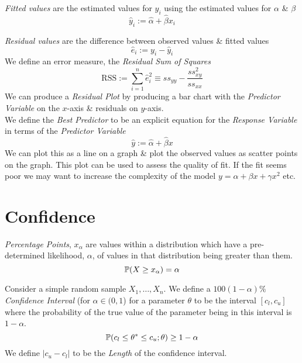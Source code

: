 \documentclass[11pt,a4paper]{article}
\begin{document}
\textit{Fitted values} are the estimated values for $y_i$ using the estimated values for $\alpha$ \& $\beta$
$$\hat{y}_i:=\hat{\alpha}+\hat{\beta}x_i$$

\textit{Residual values} are the difference between observed values \& fitted values
$$\hat{e}_i:=y_i-\hat{y}_i$$
We define an error measure, the \textit{Residual Sum of Squares}
$$\mathrm{RSS}:=\sum_{i=1}^n\hat{e}_i^2\equiv ss_{yy}-\frac{ss_{xy}^2}{ss_{xx}}$$
We can produce a \textit{Residual Plot} by producing a bar chart with the \textit{Predictor Variable} on the $x$-axis \& residuals on $y$-axis.\\

We define the \textit{Best Predictor} to be an explicit equation for the \textit{Response Variable} in terms of the \textit{Predictor Variable}
$$\hat{y}:=\hat{\alpha}+\hat{\beta}x$$
We can plot this as a line on a graph \& plot the observed values as scatter points on the graph. This plot can be used to assess the quality of fit. If the fit seems poor we may want to increase the complexity of the model \eg $y=\alpha+\beta x+\gamma x^2$ etc.


\section{Confidence}

\textit{Percentage Points}, $x_\alpha$ are values within a distribution which have a pre-determined likelihood, $\alpha$, of values in that distribution being greater than them.
$$\mathbb{P}(X\geq x_\alpha)=\alpha$$

Consider a simple random sample $X_1,\dots,X_n$. We define a $100(1-\alpha)\%$ \textit{Confidence Interval} (for $\alpha\in(0,1$) for a parameter $\theta$ to be the interval $[c_l,c_u]$ where the probability of the true value of the parameter being in this interval is $1-\alpha$.
$$\mathbb{P}(c_l\leq\theta^*\leq c_u;\theta)\geq1-\alpha$$
\NB We define $|c_u-c_l|$ to be the \textit{Length} of the confidence interval.\\
\end{document}
